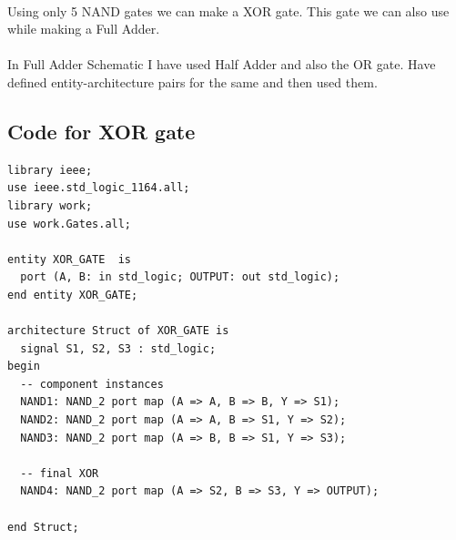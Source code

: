 \documentclass[12pt]{article}
\begin{document}
\paragraph{}
Using only 5 NAND gates we can make a XOR gate. This gate we can also use while making a Full Adder.
\paragraph{}
In Full Adder Schematic I have used Half Adder and also the OR gate. Have defined entity-architecture pairs for the same and then used them.


\subsection{Code for XOR gate}

\begin{verbatim}
library ieee;
use ieee.std_logic_1164.all;
library work;
use work.Gates.all;

entity XOR_GATE  is
  port (A, B: in std_logic; OUTPUT: out std_logic);
end entity XOR_GATE;

architecture Struct of XOR_GATE is
  signal S1, S2, S3 : std_logic;
begin
  -- component instances
  NAND1: NAND_2 port map (A => A, B => B, Y => S1);
  NAND2: NAND_2 port map (A => A, B => S1, Y => S2);
  NAND3: NAND_2 port map (A => B, B => S1, Y => S3);
  
  -- final XOR
  NAND4: NAND_2 port map (A => S2, B => S3, Y => OUTPUT);
  
end Struct;
\end{verbatim}
\end{document}
